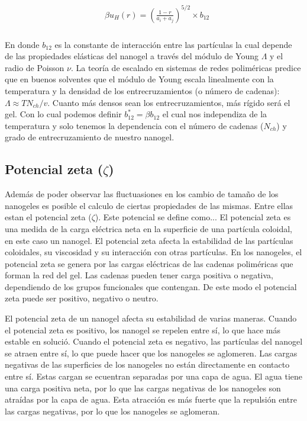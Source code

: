 \begin{align}
	\begin{aligned}
		& \beta u_H (r) = \left(\frac{1-r}{a_i + a_j}\right)^{5/2}\times b_{12} \\
	\end{aligned}
\end{align}


En donde $b_{12}$ es la constante de interacci\'on entre las part\'iculas la cual depende de las propiedades el\'asticas del nanogel a trav\'es del m\'odulo de Young $\Lambda$ y el radio de Poisson $\nu$. \addcite[landau] La teor\'ia de escalado en sistemas de redes polim\'ericas predice que en buenos solventes \addcite que el m\'odulo de Young  escala linealmente con la temperatura y la densidad de los entrecruzamientos (o n\'umero de cadenas): $\Lambda \approx TN_{ch}/v$. Cuanto m\'as densos sean los entrecruzamientos, m\'as r\'igido ser\'a el gel.
Con lo cual podemos definir $b_{12}^\ast = \beta b_{12}$ el cual nos independiza de la temperatura y solo tenemos la dependencia con el n\'umero de cadenas ($N_{ch}$) y grado de entrecruzamiento de nuestro nanogel. 


\subsection{Potencial zeta ($\zeta$)}


Adem\'as de poder observar las fluctuasiones en los cambio de tamaño de los nanogeles es posible el calculo de ciertas propiedades de las mismas. Entre ellas estan el potencial zeta ($\zeta$).
Este potencial se define como...
El potencial zeta es una medida de la carga el\'ectrica neta en la superficie de una part\'icula coloidal, en este caso un nanogel. El potencial zeta afecta la estabilidad de las part\'iculas coloidales, su viscosidad y su interacci\'on con otras part\'iculas.
En los nanogeles, el potencial zeta se genera por las cargas el\'ectricas de las cadenas polim\'ericas que forman la red del gel. Las cadenas  pueden tener carga positiva o negativa, dependiendo de los grupos funcionales que contengan. De este modo el potencial zeta puede ser positivo, negativo o neutro.

El potencial zeta de un nanogel afecta su estabilidad de varias maneras. Cuando el potencial zeta es positivo, los nanogel se repelen entre s\'i, lo que hace m\'as estable en soluci\'o. Cuando el potencial zeta es negativo, las part\'iculas del nanogel se atraen entre s\'i, lo que puede hacer que los nanogeles se aglomeren.
Las cargas negativas de las superficies de los nanogeles no est\'an directamente en contacto entre s\'i. Estas cargan se ecuentran  separadas por una capa de agua. El agua tiene una carga positiva neta, por lo que las cargas negativas de los nanogeles son atra\'idas por la capa de agua. Esta atracci\'on es m\'as fuerte que la repulsi\'on entre las cargas negativas, por lo que los nanogeles se aglomeran.

